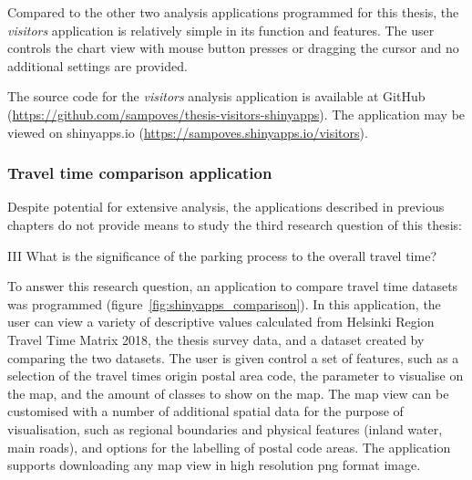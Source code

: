 Compared to the other two analysis applications programmed for this thesis, the \textit{visitors} application is relatively simple in its function and features. The user controls the chart view with mouse button presses or dragging the cursor and no additional settings are provided.

The source code for the \textit{visitors} analysis application is available at GitHub (\textcolor{blue}{\url{https://github.com/sampoves/thesis-visitors-shinyapps}}). The application may be viewed on shinyapps.io (\textcolor{blue}{\url{https://sampoves.shinyapps.io/visitors}}).

\subsubsection{Travel time comparison application}

Despite potential for extensive analysis, the applications described in previous chapters do not provide means to study the third research question of this thesis:

\begin{displayquote}
    III What is the significance of the parking process to the overall travel time?
\end{displayquote}

To answer this research question, an application to compare travel time datasets was programmed (figure~\ref{fig:shinyapps_comparison}). In this application, the user can view a variety of descriptive values calculated from Helsinki Region Travel Time Matrix 2018, the thesis survey data, and a dataset created by comparing the two datasets. The user is given control a set of features, such as a selection of the travel times origin postal area code, the parameter to visualise on the map, and the amount of classes to show on the map. The map view can be customised with a number of additional spatial data for the purpose of visualisation, such as regional boundaries and physical features (inland water, main roads), and options for the labelling of postal code areas. The application supports downloading any map view in high resolution png format image.

